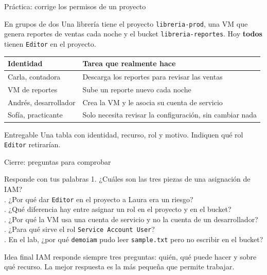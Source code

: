 \documentclass[aspectratio=169,10pt,c]{beamer}
\begin{document}
\begin{frame}{Práctica: corrige los permisos de un proyecto}
\begin{block}{En grupos de dos}
\small Una librería tiene el proyecto \texttt{libreria-prod}, una VM que genera reportes de ventas cada noche y el bucket \texttt{libreria-reportes}. Hoy \textbf{todos} tienen \texttt{Editor} en el proyecto.
\end{block}
\renewcommand{\arraystretch}{1.15}
\centering\small
\begin{tabular}{@{}p{3.6cm}p{8.6cm}@{}}
\toprule
\textbf{Identidad} & \textbf{Tarea que realmente hace}\\
\midrule
Carla, contadora & Descarga los reportes para revisar las ventas\\
VM de reportes & Sube un reporte nuevo cada noche\\
Andrés, desarrollador & Crea la VM y le asocia su cuenta de servicio\\
Sofía, practicante & Solo necesita revisar la configuración, sin cambiar nada\\
\bottomrule
\end{tabular}
\par\vspace{0.5mm}
\begin{alertblock}{Entregable}
\small Una tabla con identidad, recurso, rol y motivo. Indiquen qué rol \texttt{Editor} retirarían.
\end{alertblock}
\end{frame}

\begin{frame}{Cierre: preguntas para comprobar}
\begin{block}{Responde con tus palabras}
\small
1. ¿Cuáles son las tres piezas de una asignación de IAM?\\. ¿Por qué dar \texttt{Editor} en el proyecto a Laura era un riesgo?\\. ¿Qué diferencia hay entre asignar un rol en el proyecto y en el bucket?\\. ¿Por qué la VM usa una cuenta de servicio y no la cuenta de un desarrollador?\\. ¿Para qué sirve el rol \texttt{Service Account User}?\\. En el lab, ¿por qué \texttt{demoiam} pudo leer \texttt{sample.txt} pero no escribir en el bucket?
\end{block}
\begin{alertblock}{Idea final}
\small IAM responde siempre tres preguntas: quién, qué puede hacer y sobre qué recurso. La mejor respuesta es la más pequeña que permite trabajar.
\end{alertblock}
\end{frame}
\end{document}
